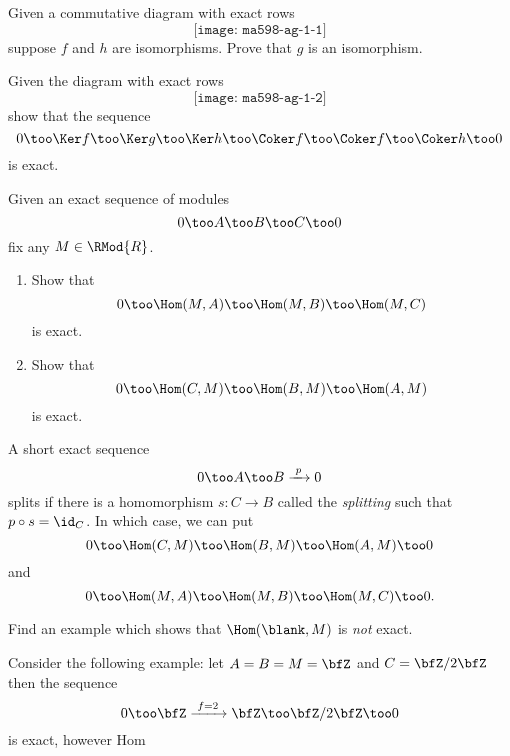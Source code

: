 \begin{problem}[\(5\)-lemma]
  Given a commutative diagram with exact rows
  \[
    \texttt{[image: ma598-ag-1-1]}
  \]
  suppose \(f\) and \(h\) are isomorphisms. Prove that \(g\) is an
  isomorphism.
\end{problem}
\begin{solution}

\end{solution}
\newpage

\begin{problem}
  Given the diagram with exact rows
  \[
    \texttt{[image: ma598-ag-1-2]}
  \]
  show that the sequence
  \[
    0\too
    \Ker f\too
    \Ker g\too
    \Ker h\too
    \Coker f\too
    \Coker f\too
    \Coker h\too
    0
  \]
  is exact.
\end{problem}
\begin{solution}
\end{solution}
\newpage

\begin{problem}
  Given an exact sequence of modules
  \[
    0\too A\too B\too C\too 0
  \]
  fix any \(M\in\RMod{R}\).
  \begin{enumerate}[label=(\alph*)]
  \item Show that
    \[
      0\too \Hom(M,A)\too\Hom(M,B)\too\Hom(M,C)
    \]
    is exact.
  \item Show that
    \[
      0\too \Hom(C,M)\too\Hom(B,M)\too\Hom(A,M)
    \]
    is exact.
  \end{enumerate}
\end{problem}
\begin{solution}
\end{solution}
\newpage

\begin{problem}
  A short exact sequence
  \[
    0\too A\too B\xrightarrow{\,\,p\,\,} 0
  \]
  splits if there is a homomorphism \(s\colon C\to B\) called the
  \emph{splitting} such that \(p\circ s=\id_C\). In which case, we can put
  \[
    0\too\Hom(C,M)\too\Hom(B,M)\too\Hom(A,M)\too 0
  \]
  and
  \[
    0\too\Hom(M,A)\too\Hom(M,B)\too\Hom(M,C)\too 0.
  \]
\end{problem}
\begin{solution}
\end{solution}
\newpage

\begin{problem}
  Find an example which shows that \(\Hom(\blank,M)\) is \emph{not} exact.
\end{problem}
\begin{solution}
  Consider the following example: let \(A=B=M=\bfZ\) and \(C=\bfZ/2\bfZ\)
  then the sequence
  \[
    0\too\bfZ\xrightarrow{\,\,f=2\,\,}\bfZ\too\bfZ/2\bfZ\too 0
  \]
  is exact, however Hom
\end{solution}

